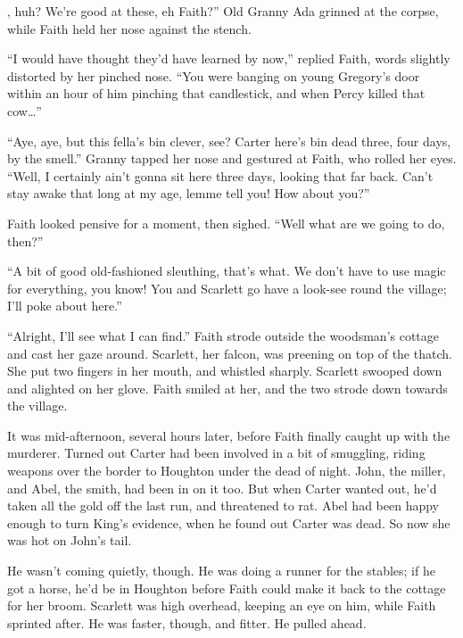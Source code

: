 
, huh?
We're good at these, eh Faith?''
Old Granny Ada grinned at the corpse, while Faith held her nose against the stench.

``I would have thought they'd have learned by now,''
replied Faith, words slightly distorted by her pinched nose.
``You were banging on young Gregory's door within an hour of him pinching that candlestick, and when Percy killed that cow{\dots}''

``Aye, aye, but this fella's bin clever, see?
Carter here's bin dead three, four days, by the smell.''
Granny tapped her nose and gestured at Faith, who rolled her eyes.
``Well, I certainly ain't gonna sit here three days, looking that far back.
Can't stay awake that long at my age, lemme tell you!
How about you?''

Faith looked pensive for a moment, then sighed.
``Well what are we going to do, then?''

``A bit of good old-fashioned sleuthing, that's what.
We don't have to use magic for everything, you know!
You and Scarlett go have a look-see round the village;
I'll poke about here.''

\newcommand\foretellingstoryrepeat{%
	``Alright, I'll see what I can find.''
	Faith strode outside the woodsman's cottage and cast her gaze around.
	Scarlett, her falcon, was preening on top of the thatch.
	She put two fingers in her mouth,
}%
{\foretellingstoryrepeat}
and whistled sharply.
Scarlett swooped down and alighted on her glove.
Faith smiled at her, and the two strode down towards the village.

\storybreak

It was mid-afternoon, several hours later, before Faith finally caught up with the murderer.
Turned out Carter had been involved in a bit of smuggling, riding weapons over the border to Houghton under the dead of night.
John, the miller, and Abel, the smith, had been in on it too.
But when Carter wanted out, he'd taken all the gold off the last run, and threatened to rat.
Abel had been happy enough to turn King's evidence, when he found out Carter was dead.
So now she was hot on John's tail.

He wasn't coming quietly, though.
He was doing a runner for the stables; if he got a horse, he'd be in Houghton before Faith could make it back to the cottage for her broom.
Scarlett was high overhead, keeping an eye on him, while Faith sprinted after.
He was faster, though, and fitter.
He pulled ahead.

